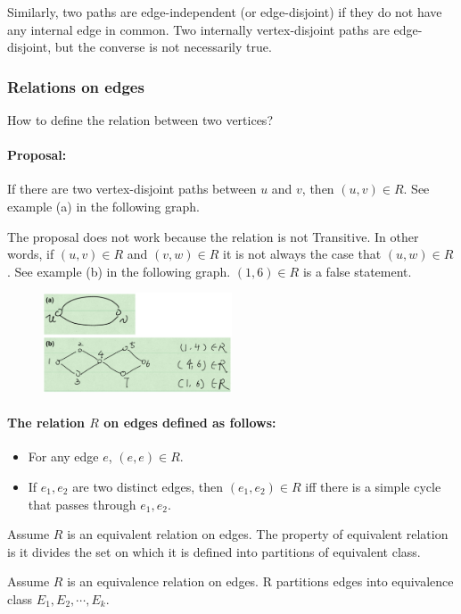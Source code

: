 Similarly, two paths are edge-independent (or edge-disjoint) if they do not 
have any internal edge in common. Two internally vertex-disjoint paths 
are edge-disjoint, but the converse is not necessarily true.

\subsubsection{Relations on edges}
How to define the relation between two vertices?

\paragraph{Proposal:} If there are two vertex-disjoint paths between $u$ and 
$v$, then $(u, v) \in R$. See example (a) in the following graph.

The proposal does not work because the relation is not Transitive. In other 
words, if $(u, v) \in R$ and $(v, w) \in R$ it is not always the case that 
$(u, w) \in R$.
See example (b) in the following graph. $(1, 6) \in R$ is a false statement.

\begin{figure}[H]
\centering
\includegraphics[width=0.5\textwidth]{relation.png}
\end{figure}

\paragraph{The relation $R$ on edges defined as follows:}
\begin{itemize}
\item For any edge $e$, $(e,e) \in R$.
\item If $e_1, e_2$ are two distinct edges, then $(e_1, e_2) \in R$ iff there 
is a simple cycle that passes through $e_1, e_2$.
\end{itemize}

Assume $R$ is an equivalent relation on edges. The property of equivalent 
relation is it divides the set on which it is defined into partitions of 
equivalent class.

Assume $R$ is an equivalence relation on edges. R partitions edges into 
equivalence class $E_1, E_2, \cdots, E_k$. 

